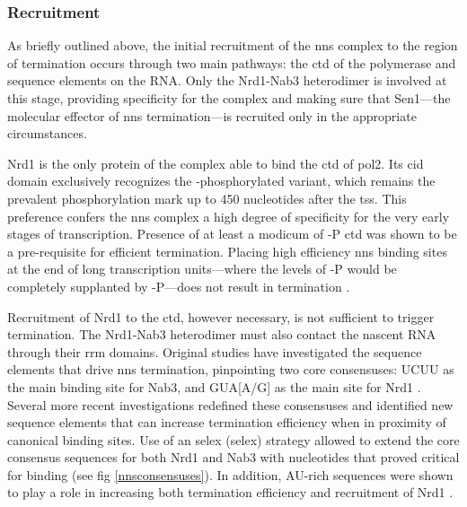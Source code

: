 \subsubsection{Recruitment}

As briefly outlined above, the initial recruitment of the \gls{nns} complex to the region of termination occurs through two main pathways: the \gls{ctd} of the polymerase and sequence elements on the RNA.
Only the Nrd1-Nab3 heterodimer is involved at this stage, providing specificity for the complex and making sure that Sen1---the molecular effector of \gls{nns} termination---is recruited only in the appropriate circumstances.

Nrd1 is the only protein of the complex able to bind the \gls{ctd} of \gls{pol2}.
Its \gls{cid} domain exclusively recognizes the \serf{}-phosphorylated variant, which remains the prevalent phosphorylation mark up to 450 nucleotides after the \gls{tss}.
This preference confers the \gls{nns} complex a high degree of specificity for the very early stages of transcription.
Presence of at least a modicum of \serf{}-P \gls{ctd} was shown to be a pre-requisite for efficient termination.
Placing high efficiency \gls{nns} binding sites at the end of long transcription units---where the levels of \serf{}-P would be completely supplanted by \sert{}-P---does not result in termination \cite{gudipati:2008:phosphorylation}.

Recruitment of Nrd1 to the \gls{ctd}, however necessary, is not sufficient to trigger termination.
The Nrd1-Nab3 heterodimer must also contact the nascent RNA through their \gls{rrm} domains.
Original studies have investigated the sequence elements that drive \gls{nns} termination, pinpointing two core consensuses: UCUU as the main binding site for Nab3, and GUA[A/G] as the main site for Nrd1 \cite{carroll:2004:identification}.
Several more recent investigations redefined these consensuses and identified new sequence elements that can increase termination efficiency when in proximity of canonical binding sites.
Use of an \invivo{} \gls{selex} (\glsdesc{selex}) strategy allowed to extend the core consensus sequences for both Nrd1 and Nab3 with nucleotides that proved critical for binding (see fig \ref{nnsconsensuses}).
In addition, AU-rich sequences were shown to play a role in increasing both termination efficiency and recruitment of Nrd1 \citep{porrua:2012:in}.

